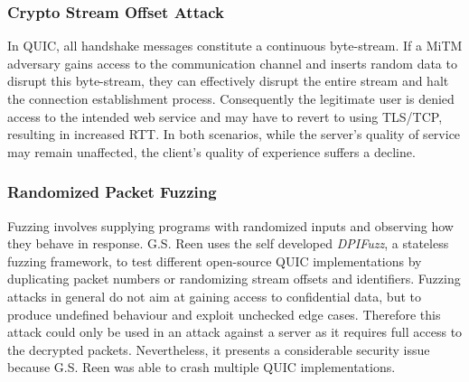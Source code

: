 \subsubsection{Crypto Stream Offset Attack}

In QUIC, all handshake messages constitute a continuous byte-stream. If a MiTM adversary gains access to the communication
channel and inserts random data to disrupt this byte-stream, they can effectively disrupt the entire stream and halt the
connection establishment process. Consequently the legitimate user is denied access to the intended web service and may have
to revert to using TLS/TCP, resulting in increased RTT. In both scenarios, while the server's quality of service may remain
unaffected, the client's quality of experience suffers a decline.

\subsubsection{Randomized Packet Fuzzing}

Fuzzing involves supplying programs with randomized inputs and observing how they behave in response. G.S. Reen\cite{quic_security_3}
uses the self developed \textit{DPIFuzz}, a stateless fuzzing framework, to test different open-source QUIC implementations by
duplicating packet numbers or randomizing stream offsets and identifiers. Fuzzing attacks in general do not aim at gaining access
to confidential data, but to produce undefined behaviour and exploit unchecked edge cases. Therefore this attack could only be
used in an attack against a server as it requires full access to the decrypted packets. Nevertheless, it presents a considerable
security issue because G.S. Reen was able to crash multiple QUIC implementations.